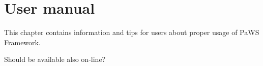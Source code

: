 \chapter{User manual}

This chapter contains information and tips for users about proper usage of PaWS Framework.

Should be available also on-line?





